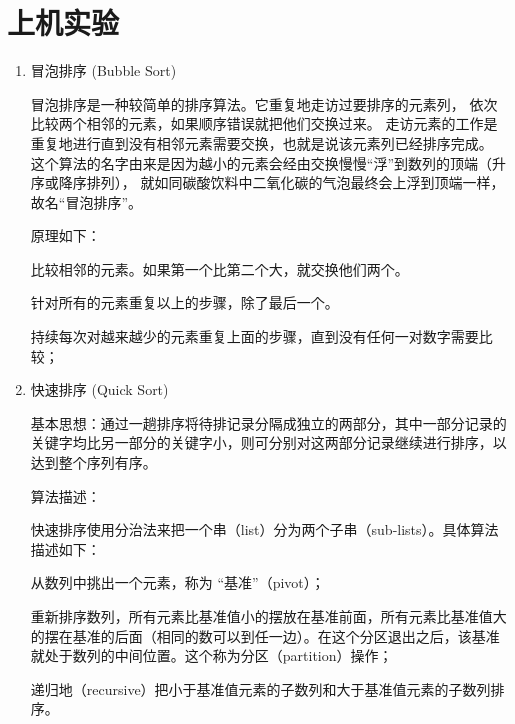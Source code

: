 \section{上机实验}
\begin{enumerate}
    \item 冒泡排序 (Bubble Sort)

          冒泡排序是一种较简单的排序算法。它重复地走访过要排序的元素列，
          依次比较两个相邻的元素，如果顺序错误就把他们交换过来。
          走访元素的工作是重复地进行直到没有相邻元素需要交换，也就是说该元素列已经排序完成。
          这个算法的名字由来是因为越小的元素会经由交换慢慢“浮”到数列的顶端（升序或降序排列），
          就如同碳酸饮料中二氧化碳的气泡最终会上浮到顶端一样，故名“冒泡排序”。

          原理如下：

          比较相邻的元素。如果第一个比第二个大，就交换他们两个。

          针对所有的元素重复以上的步骤，除了最后一个。

          持续每次对越来越少的元素重复上面的步骤，直到没有任何一对数字需要比较；

    \item 快速排序 (Quick Sort)

          基本思想：通过一趟排序将待排记录分隔成独立的两部分，其中一部分记录的关键字均比另一部分的关键字小，则可分别对这两部分记录继续进行排序，以达到整个序列有序。

          算法描述：

          快速排序使用分治法来把一个串（list）分为两个子串（sub-lists）。具体算法描述如下：

          从数列中挑出一个元素，称为 “基准”（pivot）；

          重新排序数列，所有元素比基准值小的摆放在基准前面，所有元素比基准值大的摆在基准的后面（相同的数可以到任一边）。在这个分区退出之后，该基准就处于数列的中间位置。这个称为分区（partition）操作；

          递归地（recursive）把小于基准值元素的子数列和大于基准值元素的子数列排序。

\end{enumerate}
